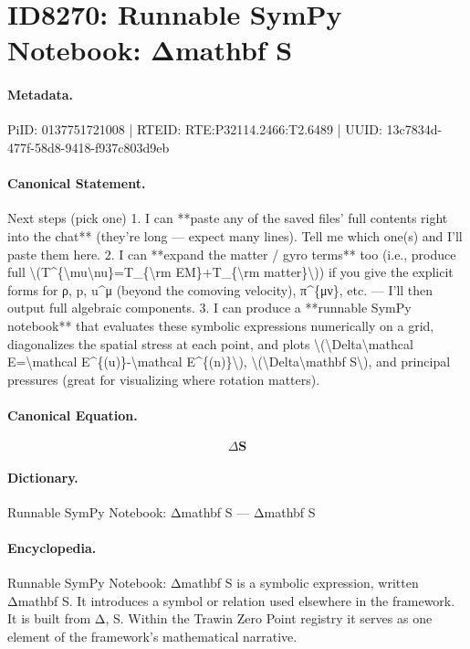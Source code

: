 \section*{ID8270: Runnable SymPy Notebook: Δmathbf S}
\paragraph{Metadata.}
PiID: 0137751721008 | RTEID: RTE:P32114.2466:T2.6489 | UUID: 13c7834d-477f-58d8-9418-f937c803d9eb

\paragraph{Canonical Statement.}
Next steps (pick one) 1. I can **paste any of the saved files’ full contents right into the chat** (they’re long — expect many lines). Tell me which one(s) and I’ll paste them here. 2. I can **expand the matter / gyro terms** too (i.e., produce full \textbackslash{}(T\textasciicircum{}\{\textbackslash{}mu\textbackslash{}nu\}=T\_\{\textbackslash{}rm EM\}+T\_\{\textbackslash{}rm matter\}\textbackslash{})) if you give the explicit forms for ρ, p, u\textasciicircum{}μ (beyond the comoving velocity), π\textasciicircum{}\{μν\}, etc. — I’ll then output full algebraic components. 3. I can produce a **runnable SymPy notebook** that evaluates these symbolic expressions numerically on a grid, diagonalizes the spatial stress at each point, and plots \textbackslash{}(\textbackslash{}Delta\textbackslash{}mathcal E=\textbackslash{}mathcal E\textasciicircum{}\{(u)\}-\textbackslash{}mathcal E\textasciicircum{}\{(n)\}\textbackslash{}), \textbackslash{}(\textbackslash{}Delta\textbackslash{}mathbf S\textbackslash{}), and principal pressures (great for visualizing where rotation matters).

\paragraph{Canonical Equation.}
\[
\Delta\mathbf S
\]

\paragraph{Dictionary.}
Runnable SymPy Notebook: Δmathbf S — Δmathbf S

\paragraph{Encyclopedia.}
Runnable SymPy Notebook: Δmathbf S is a symbolic expression, written Δmathbf S. It introduces a symbol or relation used elsewhere in the framework. It is built from Δ, S. Within the Trawin Zero Point registry it serves as one element of the framework's mathematical narrative.
